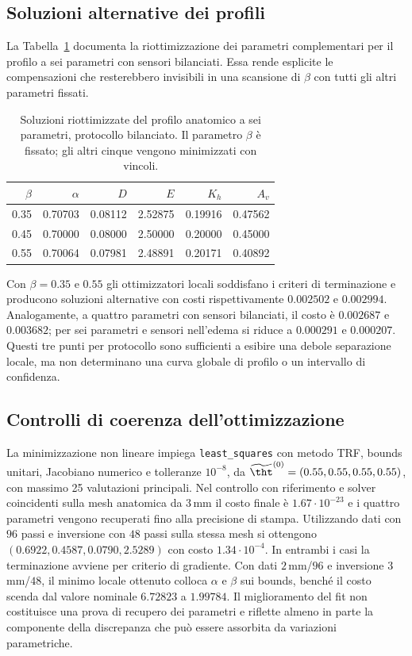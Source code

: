 \subsection*{Soluzioni alternative dei profili}
La Tabella~\ref{tab:app-compensation} documenta la riottimizzazione dei parametri complementari per il profilo a sei parametri con sensori bilanciati. Essa rende esplicite le compensazioni che resterebbero invisibili in una scansione di $\beta$ con tutti gli altri parametri fissati.
\begin{table}[H]
\centering\caption{Soluzioni riottimizzate del profilo anatomico a sei parametri, protocollo bilanciato. Il parametro $\beta$ \`e fissato; gli altri cinque vengono minimizzati con vincoli.}\label{tab:app-compensation}
\footnotesize\setlength{\tabcolsep}{2.3pt}
\begin{tabular}{@{}rrrrrr@{}}\toprule
$\beta$&$\alpha$&$D$&$E$&$K_h$&$A_v$\\\midrule
0.35&0.70703&0.08112&2.52875&0.19916&0.47562\\
0.45&0.70000&0.08000&2.50000&0.20000&0.45000\\
0.55&0.70064&0.07981&2.48891&0.20171&0.40892\\\bottomrule
\end{tabular}
\end{table}

Con $\beta=0.35$ e $0.55$ gli ottimizzatori locali soddisfano i criteri di terminazione e producono soluzioni alternative con costi rispettivamente $0.002502$ e $0.002994$. Analogamente, a quattro parametri con sensori bilanciati, il costo \`e $0.002687$ e $0.003682$; per sei parametri e sensori nell'edema si riduce a $0.000291$ e $0.000207$. Questi tre punti per protocollo sono sufficienti a esibire una debole separazione locale, ma non determinano una curva globale di profilo o un intervallo di confidenza.

\subsection*{Controlli di coerenza dell'ottimizzazione}
La minimizzazione non lineare impiega \texttt{least\_squares} con metodo TRF, bounds unitari, Jacobiano numerico e tolleranze $10^{-8}$, da $\widetilde\tht^{(0)}=(0.55,0.55,0.55,0.55)$, con massimo 25 valutazioni principali. Nel controllo con riferimento e solver coincidenti sulla mesh anatomica da $3\,$mm il costo finale \`e $1.67\cdot10^{-23}$ e i quattro parametri vengono recuperati fino alla precisione di stampa. Utilizzando dati con $96$ passi e inversione con $48$ passi sulla stessa mesh si ottengono $(0.6922,0.4587,0.0790,2.5289)$ con costo $1.34\cdot10^{-4}$. In entrambi i casi la terminazione avviene per criterio di gradiente. Con dati $2\,$mm/$96$ e inversione $3\,$mm/$48$, il minimo locale ottenuto colloca $\alpha$ e $\beta$ sui bounds, bench\'e il costo scenda dal valore nominale $6.72823$ a $1.99784$. Il miglioramento del fit non costituisce una prova di recupero dei parametri e riflette almeno in parte la componente della discrepanza che pu\`o essere assorbita da variazioni parametriche.

